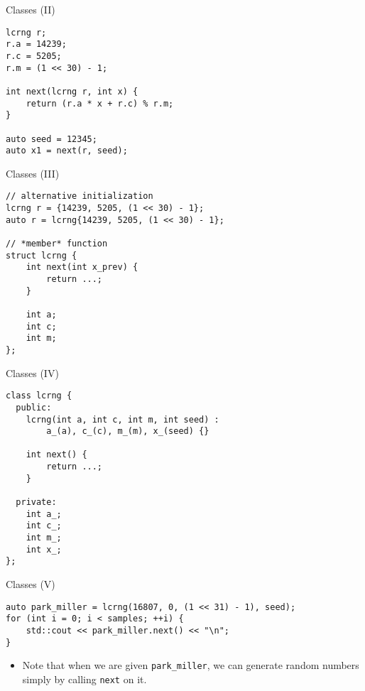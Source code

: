 \documentclass[10pt]{beamer}
\begin{document}
\begin{frame}[fragile,label={sec:orgf22af78}]{Classes (II)}
 \begin{verbatim}
lcrng r;
r.a = 14239;
r.c = 5205;
r.m = (1 << 30) - 1;

int next(lcrng r, int x) {
    return (r.a * x + r.c) % r.m;
}

auto seed = 12345;
auto x1 = next(r, seed);
\end{verbatim}
\end{frame}

\begin{frame}[fragile,label={sec:orgebc6744}]{Classes (III)}
 \begin{verbatim}
// alternative initialization
lcrng r = {14239, 5205, (1 << 30) - 1};
auto r = lcrng{14239, 5205, (1 << 30) - 1};

// *member* function 
struct lcrng {
    int next(int x_prev) {
        return ...;
    }

    int a;
    int c;
    int m;
};
\end{verbatim}
\end{frame}

\begin{frame}[fragile,label={sec:orge1d28f4}]{Classes (IV)}
 \begin{verbatim}
class lcrng {
  public:
    lcrng(int a, int c, int m, int seed) :
        a_(a), c_(c), m_(m), x_(seed) {}

    int next() {
        return ...;
    }

  private:
    int a_;
    int c_;
    int m_;
    int x_;
};
\end{verbatim}
\end{frame}

\begin{frame}[fragile,label={sec:orgf792fca}]{Classes (V)}
 \begin{verbatim}
auto park_miller = lcrng(16807, 0, (1 << 31) - 1), seed);
for (int i = 0; i < samples; ++i) {
    std::cout << park_miller.next() << "\n";
}
\end{verbatim}
\begin{itemize}
\item Note that when we are given \texttt{park\_miller}, we can generate random numbers
simply by calling \texttt{next} on it.
\end{itemize}
\end{frame}
\end{document}
